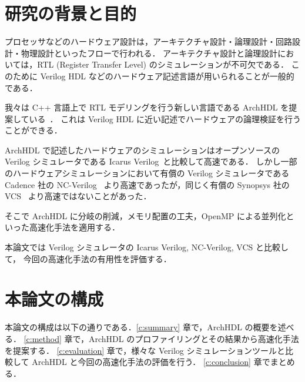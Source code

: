 \section{研究の背景と目的}

プロセッサなどのハードウェア設計は，アーキテクチャ設計・論理設計・回路設計・物理設計といったフローで行われる．
アーキテクチャ設計と論理設計においては，RTL (Register Transfer Level) のシミュレーションが不可欠である．
このために Verilog HDL などのハードウェア記述言語が用いられることが一般的である．

我々は C++ 言語上で RTL モデリングを行う新しい言語である ArchHDL を提案している~\cite{satos:archhdl}．
これは Verilog HDL に近い記述でハードウェアの論理検証を行うことができる．

ArchHDL で記述したハードウェアのシミュレーションはオープンソースの Verilog シミュレータである Icarus Verilog~\cite{iverilog}と比較して高速である．
しかし一部のハードウェアシミュレーションにおいて有償の Verilog シミュレータである Cadence 社の NC-Verilog~\cite{ncverilog} より高速であったが，同じく有償の Synopsys 社の VCS~\cite{vcs} より高速ではないことがあった．

そこで ArchHDL に分岐の削減，メモリ配置の工夫，OpenMP による並列化といった高速化手法を適用する．

本論文では Verilog シミュレータの Icarus Verilog, NC-Verilog, VCS と比較して，
今回の高速化手法の有用性を評価する．

\section{本論文の構成}

本論文の構成は以下の通りである．\ref{c:summary} 章で，ArchHDL の概要を述べる．
\ref{c:method} 章で，ArchHDL のプロファイリングとその結果から高速化手法を提案する．
\ref{c:evaluation} 章で，様々な Verilog シミュレーションツールと比較して ArchHDL と今回の高速化手法の評価を行う．
\ref{c:conclusion} 章でまとめる．